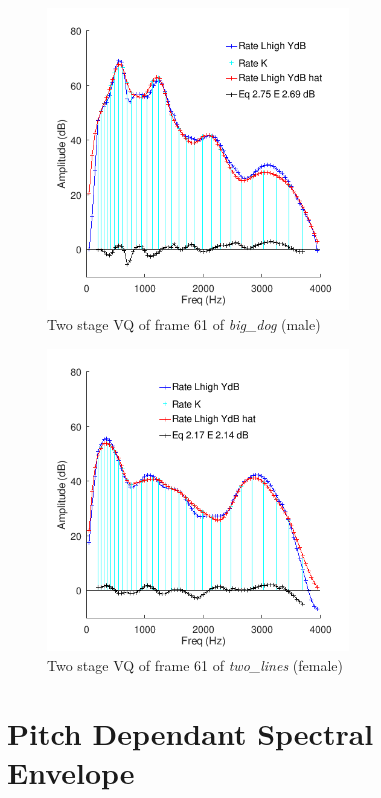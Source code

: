 \documentclass{article}
\begin{document}
\begin{figure}[h]
\caption{Two stage VQ of frame 61 of \emph{big\_dog} (male) }
\label{fig:vq_2stage_big_dog_61}
\begin{center}
\includegraphics[width=8cm]{vq_2stage_big_dog_61.png}
\end{center}
\end{figure}

\begin{figure}[h]
\caption{Two stage VQ of frame 61 of \emph{two\_lines} (female) }
\label{fig:vq_2stage_two_lines_61}
\begin{center}
\includegraphics[width=8cm]{vq_2stage_two_lines_61.png}
\end{center}
\end{figure}

\FloatBarrier

\section{Pitch Dependant Spectral Envelope}
\end{document}
